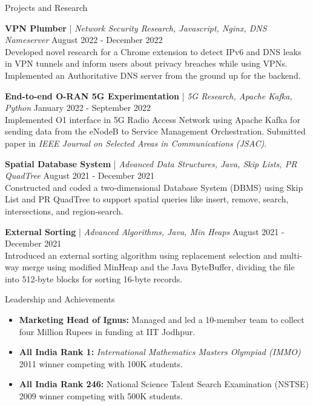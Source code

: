 \documentclass{resume} %
\begin{document}

\begin{rSection}{Projects and Research}
\vspace{-1.25em}
\item \textbf{VPN Plumber} | \textit{Network Security Research, Javascript, Nginx, DNS Nameserver}  \hfill August 2022 - December 2022\\
{Developed novel research for a Chrome extension to detect IPv6 and DNS leaks in VPN tunnels and inform users about privacy breaches while using VPNs. Implemented an Authoritative DNS server from the ground up for the backend.} 

\item \textbf{End-to-end O-RAN 5G Experimentation} | \textit{5G Research, Apache Kafka, Python} \hfill January 2022 - September 2022\\
{Implemented O1 interface in 5G Radio Access Network using Apache Kafka for sending data from the eNodeB to Service Management Orchestration. Submitted paper in \textit{IEEE Journal on Selected Areas in Communications (JSAC)}.}

\item \textbf{Spatial Database System} | \textit{Advanced Data Structures, Java, Skip Lists, PR QuadTree} \hfill August 2021 - December 2021\\
{Constructed and coded a two-dimensional Database System (DBMS) using Skip List and PR QuadTree to support spatial queries like insert, remove, search, intersections, and region-search.}

\item \textbf{External Sorting} | \textit{Advanced Algorithms, Java, Min Heaps} \hfill August 2021 - December 2021\\
{Introduced an external sorting algorithm using replacement selection and multi-way merge using modified MinHeap and the Java ByteBuffer, dividing the file into 512-byte blocks for sorting 16-byte records.}

\end{rSection}

\begin{rSection}{Leadership and Achievements} 
\begin{itemize}
    \item \textbf{Marketing Head of Ignus:} Managed and led a 10-member team to collect four Million Rupees in funding at IIT Jodhpur. 
    \item \textbf{All India Rank 1:} \textit{International Mathematics Masters Olympiad (IMMO)} 2011 winner competing with 100K students. 
    \item \textbf{All India Rank 246:} National Science Talent Search Examination (NSTSE) 2009 winner competing with 500K students.
\end{itemize}


\end{rSection}
\end{document}
